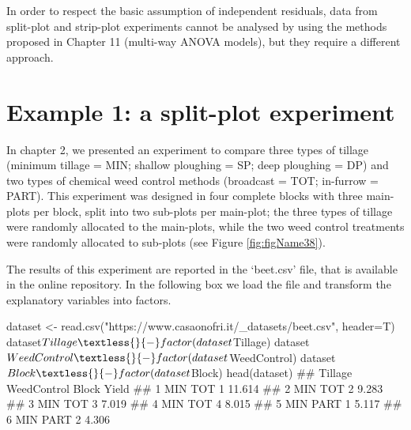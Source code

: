 \documentclass[a4paper,12pt,oneside]{book}
\newenvironment{Shaded}{\begin{snugshade}}{\end{snugshade}}
\newcommand{\SpecialCharTok}[1]{#1}
\newcommand{\StringTok}[1]{#1}
\newcommand{\DocumentationTok}[1]{#1}
\newcommand{\OtherTok}[1]{#1}
\newcommand{\FunctionTok}[1]{#1}
\newcommand{\AttributeTok}[1]{#1}
\newcommand{\NormalTok}[1]{#1}
\begin{document}
In order to respect the basic assumption of independent residuals, data from split-plot and strip-plot experiments cannot be analysed by using the methods proposed in Chapter 11 (multi-way ANOVA models), but they require a different approach.

\hypertarget{example-1-a-split-plot-experiment}{%
\section{Example 1: a split-plot experiment}\label{example-1-a-split-plot-experiment}}

In chapter 2, we presented an experiment to compare three types of tillage (minimum tillage = MIN; shallow ploughing = SP; deep ploughing = DP) and two types of chemical weed control methods (broadcast = TOT; in-furrow = PART). This experiment was designed in four complete blocks with three main-plots per block, split into two sub-plots per main-plot; the three types of tillage were randomly allocated to the main-plots, while the two weed control treatments were randomly allocated to sub-plots (see Figure \ref{fig:figName38}).

The results of this experiment are reported in the `beet.csv' file, that is available in the online repository. In the following box we load the file and transform the explanatory variables into factors.

\begin{Shaded}
\begin{Highlighting}[]
\NormalTok{dataset }\OtherTok{\textless{}{-}} \FunctionTok{read.csv}\NormalTok{(}\StringTok{"https://www.casaonofri.it/\_datasets/beet.csv"}\NormalTok{, }\AttributeTok{header=}\NormalTok{T)}
\NormalTok{dataset}\SpecialCharTok{$}\NormalTok{Tillage }\OtherTok{\textless{}{-}} \FunctionTok{factor}\NormalTok{(dataset}\SpecialCharTok{$}\NormalTok{Tillage)}
\NormalTok{dataset}\SpecialCharTok{$}\NormalTok{WeedControl }\OtherTok{\textless{}{-}} \FunctionTok{factor}\NormalTok{(dataset}\SpecialCharTok{$}\NormalTok{WeedControl)}
\NormalTok{dataset}\SpecialCharTok{$}\NormalTok{Block }\OtherTok{\textless{}{-}} \FunctionTok{factor}\NormalTok{(dataset}\SpecialCharTok{$}\NormalTok{Block)}
\FunctionTok{head}\NormalTok{(dataset)}
\DocumentationTok{\#\#   Tillage WeedControl Block  Yield}
\DocumentationTok{\#\# 1     MIN         TOT     1 11.614}
\DocumentationTok{\#\# 2     MIN         TOT     2  9.283}
\DocumentationTok{\#\# 3     MIN         TOT     3  7.019}
\DocumentationTok{\#\# 4     MIN         TOT     4  8.015}
\DocumentationTok{\#\# 5     MIN        PART     1  5.117}
\DocumentationTok{\#\# 6     MIN        PART     2  4.306}
\end{Highlighting}
\end{Shaded}
\end{document}
